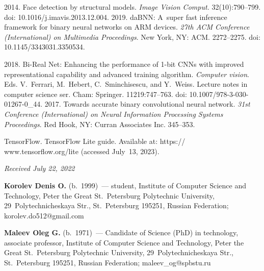 \begin{multicols}{2}
{{\begin{thebibliography}{99}
 2014. Face detection by structural models. 
\textit{Image Vision Comput.} 32(10):790--799. doi: 10.1016/j.imavis.2013.12.004.
 2019. daBNN: A~super fast inference 
framework for binary neural networks on ARM devices. \textit{27th ACM Conference (International) on 
Multimedia Proceedings}. New York, NY: ACM. 2272--2275. doi: 10.1145/3343031.3350534.

 2018. Bi-Real Net: Enhancing 
the performance of 1-bit CNNs with improved representational capability and advanced training 
algorithm. \textit{Computer vision}. Eds. V.~Ferrari, M.~Hebert, 
C.~Sminchisescu, and Y.~Weiss. Lecture notes in computer science ser. Cham: Springer. 
11219:747--763. doi: 10.1007/978-3-030-01267-0\_44.
 2017. Towards accurate binary convolutional neural 
network. \textit{31st Conference (International) on Neural Information Processing Systems Proceedings}. Red 
Hook, NY: Curran Associates Inc. 345--353.

  TensorFlow. TensorFlow Lite guide. Available at: {\sf   https:// www.tensorflow.org/lite} (accessed 
July~13, 2023).
  \end{thebibliography}

 }
 }

\end{multicols}

\vspace*{-6pt}

\hfill{\small\textit{Received July 22, 2022}} 

\vspace*{-12pt}
  
  \Contr
  
  \noindent
  \textbf{Korolev Denis O.} (b.\ 1999)~--- student, Institute of Computer Science 
and Technology, Peter the Great St.\ Petersburg Polytechnic University,  
29~Polytechnicheskaya Str., St.\ Petersburg 195251, Russian Federation; 
\mbox{korolev.do512@gmail.com}
  
  \vspace*{3pt}
  
  \noindent
  \textbf{Maleev Oleg G.} (b.\ 1971)~--- Candidate of Science (PhD) in technology, 
associate professor, Institute of Computer Science and Technology, Peter the Great 
St.\ Petersburg Polytechnic University, 29~Polytechnicheskaya Str., St.\ Petersburg 
195251, Russian Federation; \mbox{maleev\_og@spbstu.ru}


\label{end\stat}

\renewcommand{\bibname}{\protect\rm Литература} 